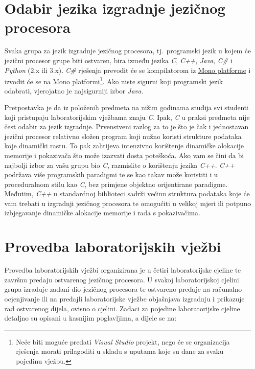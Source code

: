 \documentclass[times, 12pt, utf8]{book}
\begin{document}
\section{Odabir jezika izgradnje jezičnog procesora}
Svaka grupa za jezik izgradnje jezičnog procesora, tj.~programski jezik u kojem će jezični procesor grupe biti ostvaren, bira između jezika \emph{C}, \emph{C++}, \emph{Java}, \emph{C\#} i \emph{Python} (2.x ili 3.x).
\emph{C\#} rješenja prevodit će se kompilatorom iz \href{http://www.mono-project.com/What_is_Mono}{Mono platforme} i izvodit će se na Mono platformi\footnote{Neće biti moguće predati \emph{Visual Studio} projekt, nego će se organizacija rješenja morati prilagoditi u skladu s uputama koje su dane za svaku pojedinu vježbu.}.
Ako niste sigurni koji programski jezik odabrati, vjerojatno je najsigurniji izbor \emph{Java}.

Pretpostavka je da iz položenih predmeta na nižim godinama studija svi studenti koji pristupaju laboratorijskim vježbama znaju \emph{C}.
Ipak, \emph{C} u praksi predmeta nije čest odabir za jezik izgradnje.
Prvenstveni razlog za to je što je čak i jednostavan jezični procesor relativno složen program koji nužno koristi strukture podataka koje dinamički rastu.
To pak zahtijeva intenzivno korištenje dinamičke alokacije memorije i pokazivača što može izazvati dosta poteškoća.
Ako vam se čini da bi najbolji izbor za vašu grupu bio \emph{C}, razmislite o korištenju jezika \emph{C++}.
\emph{C++} podržava više programskih paradigmi te se kao takav može koristiti i u proceduralnom stilu kao \emph{C}, bez primjene objektno orijentirane paradigme.
Međutim, \emph{C++} u standardnoj biblioteci sadrži većinu struktura podataka koje će vam trebati u izgradnji jezičnog procesora te omogućiti u velikoj mjeri ili potpuno izbjegavanje dinamičke alokacije memorije i rada s pokazivačima.

\section{Provedba laboratorijskih vježbi}
Provedba laboratorijskih vježbi organizirana je u četiri laboratorijske cjeline te završnu predaju ostvarenog jezičnog procesora.
U svakoj laboratorijskoj cjelini grupa izrađuje zadani dio jezičnog procesora te ostvareno predaje na računalno ocjenjivanje ili na predajli laboratorijske vježbe objašnjava izgradnju i prikazuje rad ostvarenog dijela, ovisno o cjelini.
Zadaci za pojedine laboratorijske cjeline detaljno su opisani u kasnijim poglavljima, a dijele se na:
\end{document}

